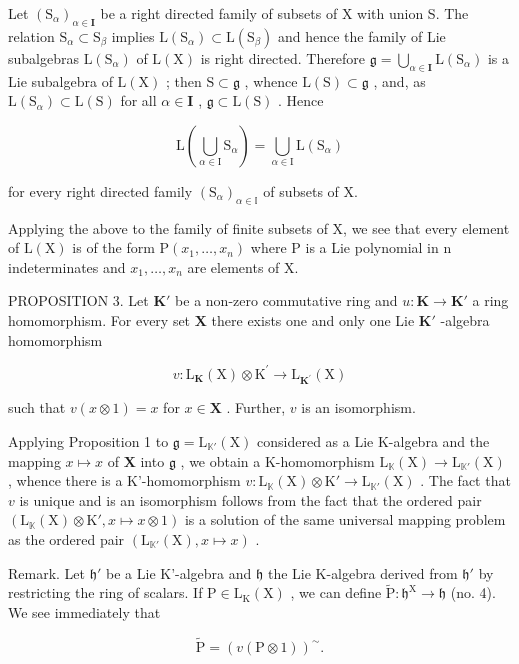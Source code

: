 Let \((\mathrm{S}_{\alpha})_{\alpha \in \mathbf{I}}\) be a right directed family of subsets of X with union S. The relation \(\mathrm{S}_{\alpha} \subset \mathrm{S}_{\beta}\) implies \(\mathrm{L}(\mathrm{S}_{\alpha}) \subset \mathrm{L}(\mathrm{S}_{\beta})\) and hence the family of Lie subalgebras \(\mathrm{L}(\mathrm{S}_{\alpha})\) of \(\mathrm{L}(\mathrm{X})\) is right directed. Therefore \(\mathfrak{g} = \bigcup_{\alpha \in \mathbf{I}} \mathrm{L}(\mathrm{S}_{\alpha})\) is a Lie subalgebra of \(\mathrm{L}(\mathrm{X})\) ; then \(\mathrm{S} \subset \mathfrak{g}\) , whence \(\mathrm{L}(\mathrm{S}) \subset \mathfrak{g}\) , and, as \(\mathrm{L}(\mathrm{S}_{\alpha}) \subset \mathrm{L}(\mathrm{S})\) for all \(\alpha \in \mathbf{I}\) , \(\mathfrak{g} \subset \mathrm{L}(\mathrm{S})\) . Hence

\[
\mathrm{L} \left(\bigcup_ {\alpha \in \mathrm{I}} \mathrm{S} _ {\alpha}\right) = \bigcup_ {\alpha \in \mathrm{I}} \mathrm{L} (\mathrm{S} _ {\alpha})\tag{7}
\]

for every right directed family \((\mathrm{S}_{\alpha})_{\alpha\in\mathbb{I}}\) of subsets of X.

Applying the above to the family of finite subsets of X, we see that every element of \(\mathrm{L}(\mathrm{X})\) is of the form \(\mathrm{P}(x_{1},\ldots,x_{n})\) where P is a Lie polynomial in n indeterminates and \(x_{1},\ldots,x_{n}\) are elements of X.

PROPOSITION 3. Let \(\mathbf{K}'\) be a non-zero commutative ring and \(u: \mathbf{K} \to \mathbf{K}'\) a ring homomorphism. For every set \(\mathbf{X}\) there exists one and only one Lie \(\mathbf{K}'\) -algebra homomorphism

\[
v \colon \mathrm{L} _ {\mathbf {K}} (\mathrm{X}) \otimes \mathrm{K} ^ {\prime} \rightarrow \mathrm{L} _ {\mathbf {K} ^ {\prime}} (\mathrm{X})
\]

such that \(v(x \otimes 1) = x\) for \(x \in \mathbf{X}\) . Further, \(v\) is an isomorphism.

Applying Proposition 1 to \(\mathfrak{g} = \mathrm{L}_{\mathbb{K}'}(\mathrm{X})\) considered as a Lie K-algebra and the mapping \(x\mapsto x\) of \(\mathbf{X}\) into \(\mathfrak{g}\) , we obtain a K-homomorphism \(\mathrm{L}_{\mathbb{K}}(\mathrm{X})\to \mathrm{L}_{\mathbb{K}'}(\mathrm{X})\) , whence there is a K'-homomorphism \(v\colon \mathrm{L}_{\mathbb{K}}(\mathrm{X})\otimes \mathrm{K}'\to \mathrm{L}_{\mathbb{K}'}(\mathrm{X})\) . The fact that \(v\) is unique and is an isomorphism follows from the fact that the ordered pair \((\mathrm{L}_{\mathbb{K}}(\mathrm{X})\otimes \mathrm{K}',x\mapsto x\otimes 1)\) is a solution of the same universal mapping problem as the ordered pair \((\mathrm{L}_{\mathbb{K}'}(\mathrm{X}),x\mapsto x)\) .

Remark. Let \(\mathfrak{h}'\) be a Lie K'-algebra and \(\mathfrak{h}\) the Lie K-algebra derived from \(\mathfrak{h}'\) by restricting the ring of scalars. If \(\mathrm{P} \in \mathrm{L}_{\mathrm{K}}(\mathrm{X})\) , we can define \(\tilde{\mathrm{P}}: \mathfrak{h}^{\mathrm{X}} \to \mathfrak{h}\) (no. 4). We see immediately that

\[
\tilde {\mathrm{P}} = (v (\mathrm{P} \otimes 1)) ^ {\sim}.
\]
